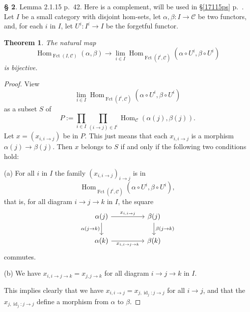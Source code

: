 \documentclass[12pt]{article}
\newtheorem{thm}{Theorem}
\theoremstyle{remark}
\theoremstyle{definition}
\newtheorem{s}[thm]{\S}
\newcommand{\nn}{\noindent}
\newcommand{\C}{\mathcal C}
\DeclareMathOperator{\id}{id}
\DeclareMathOperator{\Fct}{Fct}
\DeclareMathOperator{\Hom}{Hom}
\begin{document}
%

\begin{s}
Lemma 2.1.15 p.~42. Here is a complement, will be used in \S\ref{17115ps} p.~\pageref{17115ps}. Let $I$ be a small category with disjoint hom-sets, let $\alpha,\beta:I\to\C$ be two functors, and, for each $i$ in $I$, let $U^i:I^i\to I$ be the forgetful functor. 

\begin{thm}\label{fgd}
The natural map 
$$
\Hom_{\Fct(I,\C)}(\alpha,\beta)\to\lim_{i\in I}\Hom_{\Fct(I^i,\C)}(\alpha\circ U^i,\beta\circ U^i)
$$ 
is bijective.
\end{thm}

\begin{proof}
View 
$$
\lim_{i\in I}\Hom_{\Fct(I^i,\C)}(\alpha\circ U^i,\beta\circ U^i)
$$ 
as a subset $S$ of 
$$
P:=\prod_{i\in I}\prod_{(i\to j)\in I^i}\Hom_\C(\alpha(j),\beta(j)).
$$ 
Let $x=(x_{i,i\to j})$ be in $P$. This just means that each $x_{i,i\to j}$ is a morphism $\alpha(j)\to\beta(j)$. Then $x$ belongs to $S$ if and only if the following two conditions hold:

\nn(a) For all $i$ in $I$ the family $(x_{i,i\to j})_{i\to j}$ is in 
$$
\Hom_{\Fct(I^i,\C)}(\alpha\circ U^i,\beta\circ U^i),
$$ 
that is, for all diagram $i\to j\to k$ in $I$, the square 
$$
\begin{tikzcd}
\alpha(j)\ar{rr}{x_{i,i\to j}}\ar{d}[swap]{\alpha(j\to k)}&&\beta(j)\ar{d}{\beta(j\to k)}\\ 
\alpha(k)\ar{rr}[swap]{x_{i,i\to j\to k}}&&\beta(k)
\end{tikzcd}
$$
commutes.

\nn(b) We have $x_{i,i\to j\to k}=x_{j,j\to k}$ for all diagram $i\to j\to k$ in $I$. 

\nn This implies clearly that we have $x_{i,i\to j}=x_{j,\id_j:j\to j}$ for all $i\to j$, and that the $x_{j,\id_j:j\to j}$ define a morphism from $\alpha$ to $\beta$.
\end{proof}
\end{s}
\end{document}

